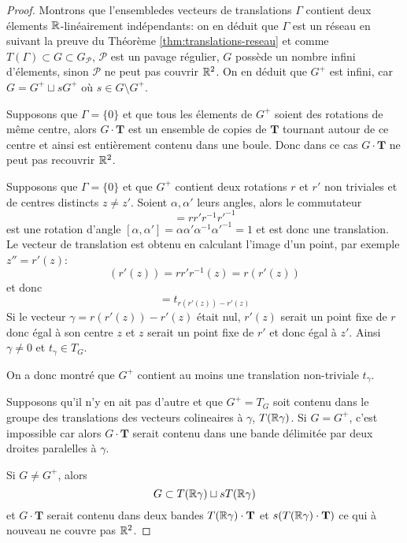 \begin{proof}
	Montrons que l'ensembledes vecteurs de translations $\Gamma$ contient deux
	élements $\mathbb{R}$-linéairement indépendants: on en déduit que $\Gamma$ est un
	réseau en suivant la preuve du Théorème \ref{thm:translations-reseau} et
	comme $T(\Gamma) \subset G \subset G_\mathcal{P}$, $\mathcal{P}$ est un
	pavage régulier, $G$ possède un nombre infini d'élements, sinon $\mathcal{P}$ ne peut pas
	couvrir $\mathbb{R}^2$. On en déduit que $G^+$ est infini, car
	$G = G^+ \sqcup sG^+$ où $s \in G \setminus G^+$.

	Supposons que $\Gamma = \{0\}$ et que tous les élements de $G^+$ soient des
	rotations de même centre, alors $G \cdot \mathbf{T}$ est un ensemble de copies de
	$\mathbf{T}$ tournant autour de ce centre et ainsi est entièrement contenu
	dans une boule. Donc dans ce cas $G \cdot \mathbf{T}$
	ne peut pas recouvrir $\mathbb{R}^2$.

	Supposons que $\Gamma = \{0\}$ et que $G^+$ contient deux rotations $r$ et
	$r'$ non triviales et de centres distincts $z \neq z'$.
	Soient $\alpha, \alpha'$ leurs angles, alors le commutateur
	\begin{equation*}
		[r, r'] = rr'r^{-1}r'^{-1}
	\end{equation*}
	est une rotation d'angle
	$[\alpha, \alpha'] = \alpha \alpha' \alpha^{-1} \alpha'^{-1} = 1$ et est donc
	une translation. Le vecteur de translation est obtenu en calculant l'image
	d'un point, par exemple $z'' = r'(z)$:
	\begin{equation*}
		[r,r'](r'(z)) = rr'r^{-1}(z) = r(r'(z))
	\end{equation*}
	et donc
	\begin{equation*}
		[r, r'] = t_{r(r'(z)) - r'(z)}
	\end{equation*}
	Si le vecteur $\gamma = r(r'(z)) - r'(z)$ était nul, $r'(z)$ serait un point
	fixe de $r$ donc égal à son centre $z$ et $z$ serait un point fixe de $r'$
	et donc égal à $z'$. Ainsi $\gamma \neq 0$ et $t_\gamma \in T_G$.

	On a donc montré que $G^+$ contient au moins une translation non-triviale
	$t_\gamma$.

	Supposons qu'il n'y en ait pas d'autre et que $G^+ = T_G$ soit contenu dans
	le groupe des translations des vecteurs colineaires à $\gamma$,
	$T(\mathbb{R}\gamma)$. Si $G = G^+$, c'est impossible car alors $G \cdot \mathbf{T}$
	serait contenu dans une bande délimitée par deux droites paralelles à
	$\gamma$.

	Si $G \neq G^+$, alors
	\begin{equation*}
		G \subset T(\mathbb{R}\gamma) \sqcup sT(\mathbb{R}\gamma)
	\end{equation*}
	et $G \cdot \mathbf{T}$ serait contenu dans deux bandes
	$T(\mathbb{R}\gamma) \cdot \mathbf{T}$ et $s(T(\mathbb{R}\gamma) \cdot \mathbf{T})$ ce qui à
	nouveau ne couvre pas $\mathbb{R}^2$.


\end{proof}
